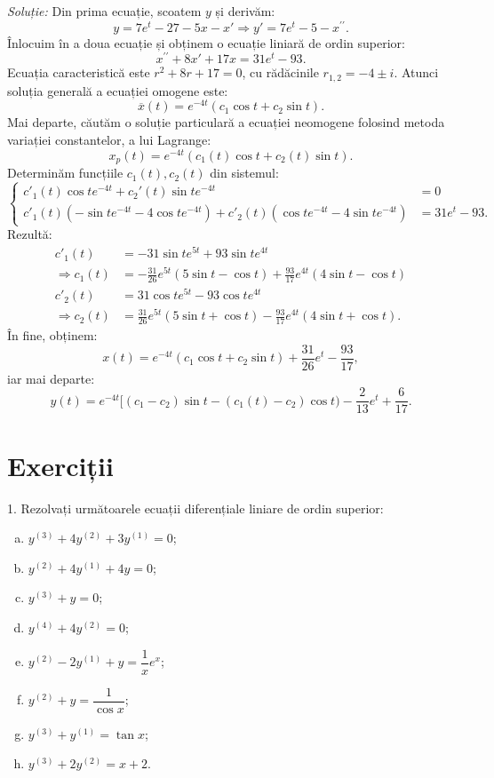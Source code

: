 \emph{Soluție:} Din prima ecuație, scoatem $y$ și derivăm:
\[
  y = 7e^t - 27 - 5x - x' \Rightarrow y' = 7e^t - 5 - x^{\prime\prime}.
\]
Înlocuim în a doua ecuație și obținem o ecuație liniară de ordin superior:
\[
  x^{\prime\prime} + 8x' + 17x = 31e^t - 93.
\]
Ecuația caracteristică este $r^2 + 8r + 17 = 0$, cu rădăcinile $r_{1,2} = -4 \pm i$.
Atunci soluția generală a ecuației omogene este:
\[
  \overline{x}(t) = e^{-4t}(c_1 \cos t + c_2 \sin t).
\]
Mai departe, căutăm o soluție particulară a ecuației neomogene folosind metoda
variației constantelor, a lui Lagrange:
\[
  x_p(t) = e^{-4t}(c_1(t) \cos t + c_2(t) \sin t).
\]
Determinăm funcțiile $c_1(t), c_2(t)$ din sistemul:
\[
  \begin{cases}
    c'_1(t) \cos t e^{-4t} + c_2'(t) \sin t e^{-4t} &= 0 \\
    c'_1(t) (-\sin t e^{-4t} - 4\cos t e^{-4t}) + %
    c'_2(t) (\cos t e^{-4t} - 4\sin t e^{-4t}) &= 31e^t - 93.
  \end{cases}
\]
Rezultă:
\begin{align*}
  c'_1(t) &= -31 \sin t e^{5t} + 93 \sin t e^{4t} \\
  \Rightarrow c_1(t) &= -\frac{31}{26} e^{5t}(5 \sin t - \cos t) + %
                        \frac{93}{17} e^{4t}(4 \sin t - \cos t) \\
  c'_2(t) &= 31 \cos t e^{5t} - 93\cos t e^{4t} \\
  \Rightarrow c_2(t) &= \frac{31}{26} e^{5t}(5 \sin t + \cos t) - %
                       \frac{93}{17} e^{4t}(4 \sin t + \cos t).
\end{align*}
În fine, obținem:
\[
  x(t) = e^{-4t}(c_1 \cos t + c_2 \sin t) + \frac{31}{26}e^t - \frac{93}{17},
\]
iar mai departe:
\[
  y(t) = e^{-4t}[(c_1 - c_2) \sin t - (c_1(t) - c_2) \cos t) - \frac{2}{13} e^t + \frac{6}{17}.
\]

\vspace{1cm}



\section{Exerciții}

1. Rezolvați următoarele ecuații diferențiale liniare de ordin superior:
\begin{enumerate}[(a)]
  \item $ y^{(3)} + 4y^{(2)} + 3y^{(1)} = 0 $;
  \item $ y^{(2)} + 4y^{(1)} + 4y = 0 $;
  \item $ y^{(3)} + y = 0 $;
  \item $ y^{(4)} + 4y^{(2)} = 0 $;
  \item $ y^{(2)} - 2y^{(1)} + y = \dfrac{1}{x} e^x $;
  \item $ y^{(2)} + y = \dfrac{1}{\cos x} $;
  \item $ y^{(3)} + y^{(1)} = \tan x $;
  \item $ y^{(3)} + 2y^{(2)} = x + 2 $.
\end{enumerate}

